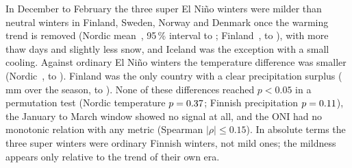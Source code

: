 In December to February the three super El Niño winters were milder than neutral winters in Finland, Sweden, Norway and Denmark once the warming trend is removed (Nordic mean \nordicTSvNdiff\,\degC, 95\,\% interval \nordicTSvNlo{} to \nordicTSvNhi; Finland \fiTSvNdiff\,\degC, \fiTSvNlo{} to \fiTSvNhi), with more thaw days and slightly less snow, and Iceland was the exception with a small cooling. Against ordinary El Niño winters the temperature difference was smaller (Nordic \nordicTSvEdiff\,\degC, \nordicTSvElo{} to \nordicTSvEhi). Finland was the only country with a clear precipitation surplus (\fiPSvNdiff\,mm over the season, \fiPSvNlo{} to \fiPSvNhi). None of these differences reached $p < 0.05$ in a permutation test (Nordic temperature $p = 0.37$; Finnish precipitation $p = 0.11$), the January to March window showed no signal at all, and the ONI had no monotonic relation with any metric (Spearman $|\rho| \le 0.15$). In absolute terms the three super winters were ordinary Finnish winters, not mild ones; the mildness appears only relative to the trend of their own era.
